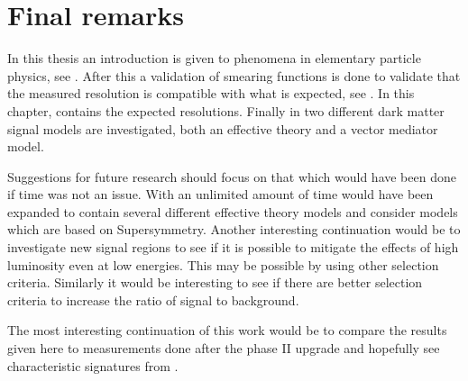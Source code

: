 \chapter{Final remarks}\label{cha:res}
In this thesis an introduction is given to phenomena in elementary particle physics, see . After this a validation of smearing functions is done to validate that the measured resolution is compatible with what is expected, see . In this chapter,  contains the expected resolutions. 
Finally in  two different dark matter signal models are investigated, both an effective theory and a vector mediator model.

Suggestions for future research should focus on that which would have been done if time was not an issue. With an unlimited amount of time  would have been expanded to contain several different effective theory models and consider models which are based on Supersymmetry. Another interesting continuation would be to investigate new signal regions to see if it is possible to mitigate the effects of high luminosity even at low energies. This may be possible by using other selection criteria. Similarly it would be interesting to see if there are better selection criteria to increase the ratio of signal to background.  

The most interesting continuation of this work would be to compare the results given here to measurements done after the phase II upgrade and hopefully see characteristic signatures from \abbrWIMPS .